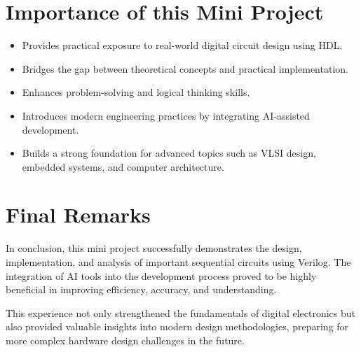 \documentclass[12pt]{article}
\begin{document}
\section*{Importance of this Mini Project}

\begin{itemize}
    \item Provides practical exposure to real-world digital circuit design using HDL.
    
    \item Bridges the gap between theoretical concepts and practical implementation.
    
    \item Enhances problem-solving and logical thinking skills.
    
    \item Introduces modern engineering practices by integrating AI-assisted development.
    
    \item Builds a strong foundation for advanced topics such as VLSI design, embedded systems, and computer architecture.
\end{itemize}

\section*{Final Remarks}

In conclusion, this mini project successfully demonstrates the design, implementation, and analysis of important sequential circuits using Verilog. The integration of AI tools into the development process proved to be highly beneficial in improving efficiency, accuracy, and understanding.

This experience not only strengthened the fundamentals of digital electronics but also provided valuable insights into modern design methodologies, preparing for more complex hardware design challenges in the future.
\end{document}
